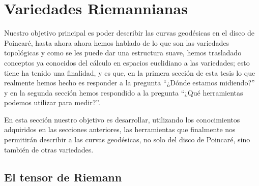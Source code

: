 \chapter{Variedades Riemannianas}\label{Capitulo: Variedades Riemannianas}

Nuestro objetivo principal es poder describir las curvas geodésicas en el disco de Poincaré, hasta ahora ahora hemos hablado de lo que son las variedades topológicas y como se les puede dar una estructura suave, hemos trasladado conceptos ya conocidos del cálculo en espacios euclidiano a las variedades; esto tiene ha tenido una finalidad, y es que, en la primera sección de esta tesis lo que realmente hemos hecho es responder a la pregunta \enquote{¿Dónde estamos midiendo?} y en la segunda sección hemos respondido a la pregunta \enquote{¿Qué herramientas podemos utilizar para medir?}. 

En esta sección nuestro objetivo es desarrollar, utilizando los conocimientos adquiridos en las secciones anteriores, las herramientas que finalmente nos permitirán describir a las curvas geodésicas, no solo del disco de Poincaré, sino también de otras variedades.

\section{El tensor de Riemann}
